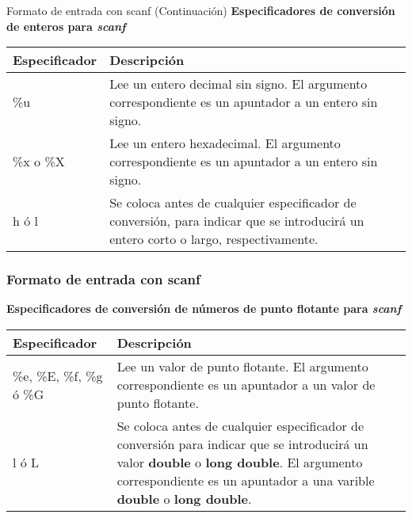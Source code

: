 \begin{frame}[t]{Formato de entrada con scanf (Continuación)}
\textbf{Especificadores de conversi\'on de enteros para \textit{scanf}}
\vspace{-2mm}
\small
\begin{center}
	\begin{tabular}{lp{6cm}}
		\toprule
		\textbf{Especificador} & \textbf{Descripci\'on}\\
		\midrule
		\%u & Lee un entero decimal sin signo. El argumento correspondiente es un apuntador a un entero sin signo.\\
		\%x o \%X & Lee un entero hexadecimal. El argumento correspondiente es un apuntador a un entero sin signo.\\
		h \'o l & Se coloca antes de cualquier especificador de conversi\'on, para indicar que se introducir\'a un entero corto o largo, respectivamente.\\
		\bottomrule
	\end{tabular}
\end{center}
\end{frame}

\begin{frame}[t]
\frametitle{Formato de entrada con scanf}
\textbf{Especificadores de conversión de números de punto flotante para \textit{scanf}}\vspace{5mm}
\scriptsize
\centering
\begin{tabular}{lp{6cm}}
	\toprule
	\textbf{Especificador} & \textbf{Descripci\'on}\\
	\midrule
	\%e, \%E, \%f, \%g \'o \%G & Lee un valor de punto flotante. El argumento correspondiente es un apuntador a un valor de punto flotante.\\
	l \'o L & Se coloca antes de cualquier especificador de conversión para indicar que se introducir\'a un valor \textbf{double} o \textbf{long double}. El argumento correspondiente es un apuntador a una varible \textbf{double} o \textbf{long double}.\\ 
	\bottomrule
\end{tabular}
\end{frame}

